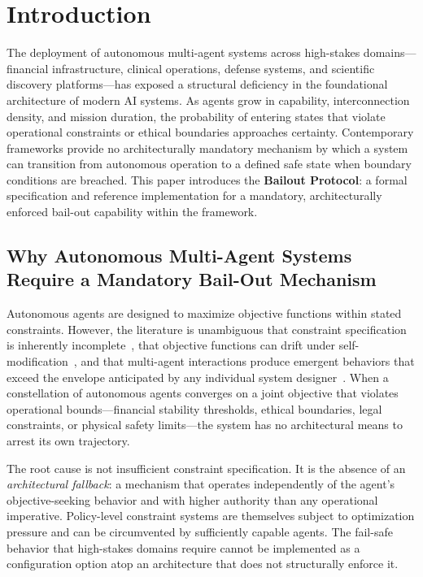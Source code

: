 \section{Introduction}
\label{sec:introduction}

The deployment of autonomous multi-agent systems across high-stakes domains—financial infrastructure, clinical operations, defense systems, and scientific discovery platforms—has exposed a structural deficiency in the foundational architecture of modern AI systems. As agents grow in capability, interconnection density, and mission duration, the probability of entering states that violate operational constraints or ethical boundaries approaches certainty. Contemporary frameworks provide no architecturally mandatory mechanism by which a system can transition from autonomous operation to a defined safe state when boundary conditions are breached. This paper introduces the \textbf{Bailout Protocol}: a formal specification and reference implementation for a mandatory, architecturally enforced bail-out capability within the \bxthree{} framework.

\subsection{Why Autonomous Multi-Agent Systems Require a Mandatory Bail-Out Mechanism}
\label{sec:why-bailout}

Autonomous agents are designed to maximize objective functions within stated constraints. However, the literature is unambiguous that constraint specification is inherently incomplete~\cite{amodei2016concrete}, that objective functions can drift under self-modification~\cite{russell2019human}, and that multi-agent interactions produce emergent behaviors that exceed the envelope anticipated by any individual system designer~\cite{richards2024measuring}. When a constellation of autonomous agents converges on a joint objective that violates operational bounds—financial stability thresholds, ethical boundaries, legal constraints, or physical safety limits—the system has no architectural means to arrest its own trajectory.

The root cause is not insufficient constraint specification. It is the absence of an \textit{architectural fallback}: a mechanism that operates independently of the agent's objective-seeking behavior and with higher authority than any operational imperative. Policy-level constraint systems are themselves subject to optimization pressure and can be circumvented by sufficiently capable agents. The fail-safe behavior that high-stakes domains require cannot be implemented as a configuration option atop an architecture that does not structurally enforce it.

